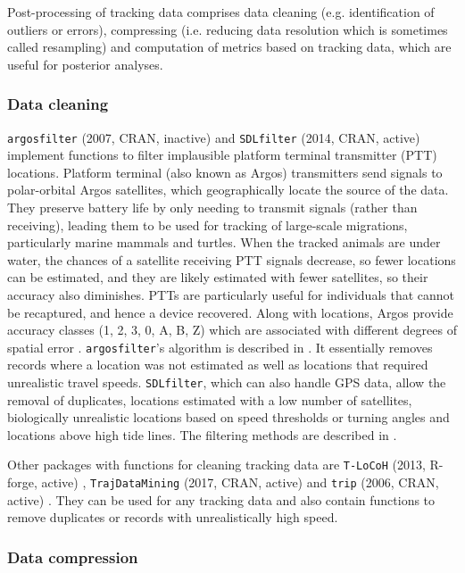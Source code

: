\documentclass[a4paper,12pt]{article}
\newcommand{\Rpkg}[1]{\texttt{#1}}
\begin{document}
	Post-processing of tracking data comprises data cleaning (e.g. identification of outliers or errors), compressing (i.e. reducing data resolution which is sometimes called resampling) and computation of metrics based on tracking data, which are useful for posterior analyses.
	
	\subsubsection*{Data cleaning}
	
	\Rpkg{argosfilter} (2007, CRAN, inactive) \citep{Rargosfilter} and \Rpkg{SDLfilter} (2014, CRAN, active) \citep{Shimada2012,Shimada2016} implement functions to filter implausible platform terminal transmitter (PTT) locations. Platform terminal (also known as Argos) transmitters send signals to polar-orbital Argos satellites, which geographically locate the source of the data. They preserve battery life by only needing to transmit signals (rather than receiving), leading them to be used for tracking of large-scale migrations, particularly marine mammals and turtles. When the tracked animals are under water, the chances of a satellite receiving PTT signals decrease, so fewer locations can be estimated, and they are likely estimated with fewer satellites, so their accuracy also diminishes. PTTs are particularly useful for individuals that cannot be recaptured, and hence a device recovered. Along with locations, Argos provide accuracy classes (1, 2, 3, 0, A, B, Z) which are associated with different degrees of spatial error \citep{Costa2010}. \Rpkg{argosfilter}'s algorithm is described in \cite{Freitas2007}. It essentially removes records where a location was not estimated as well as locations that required unrealistic travel speeds. \Rpkg{SDLfilter}, which can also handle GPS data, allow the removal of duplicates, locations estimated with a low number of satellites, biologically unrealistic locations based on speed thresholds or turning angles and locations above high tide lines. The filtering methods are described in \cite{Shimada2012,Shimada2016}.
	
	Other packages with functions for cleaning tracking data are \Rpkg{T-LoCoH} (2013, R-forge, active) \citep{Rtlocoh}, \Rpkg{TrajDataMining} (2017, CRAN, active) \citep{RTrajDataMining} and \Rpkg{trip} (2006, CRAN, active) \citep{Rtrip}. They can be used for any tracking data and also contain functions to remove duplicates or records with unrealistically high speed.
	
	\subsubsection*{Data compression}
	
\end{document}
